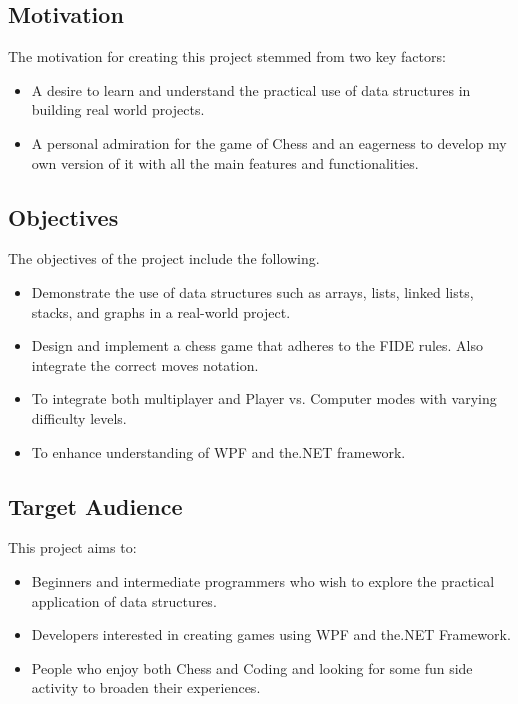 \documentclass[a4paper,12pt]{article}
\begin{document}
\subsection{Motivation}
The motivation for creating this project stemmed from two key factors:
\begin{itemize}
    \item A desire to learn and understand the practical use of data structures in building real world projects.
    \item A personal admiration for the game of Chess and an eagerness to develop my own version of it with all the main features and functionalities.
\end{itemize}

\subsection{Objectives}
The objectives of the project include the following.
\begin{itemize}
    \item Demonstrate the use of data structures such as arrays, lists, linked lists, stacks, and graphs in a real-world project.
    \item Design and implement a chess game that adheres to the FIDE rules. Also integrate the correct moves notation.
    \item To integrate both multiplayer and Player vs. Computer modes with varying difficulty levels.
    \item To enhance understanding of WPF and the.NET framework.
\end{itemize}

\subsection{Target Audience}
This project aims to:
\begin{itemize}
    \item Beginners and intermediate programmers who wish to explore the practical application of data structures.
    \item Developers interested in creating games using WPF and the.NET Framework.
    \item People who enjoy both Chess and Coding and looking for some fun side activity to broaden their experiences.
\end{itemize}
\end{document}
